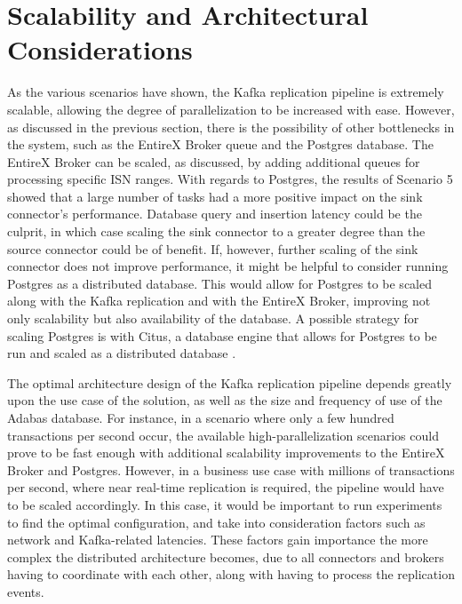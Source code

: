 \section{Scalability and Architectural Considerations}
As the various scenarios have shown, the Kafka replication pipeline is extremely scalable, allowing the degree of parallelization to be increased with ease. However, as discussed in the previous section, there is the possibility of other bottlenecks in the system, such as the EntireX Broker queue and the Postgres database. The EntireX Broker can be scaled, as discussed, by adding additional queues for processing specific \ac{ISN} ranges. With regards to Postgres, the results of Scenario 5 showed that a large number of tasks had a more positive impact on the sink connector's performance. Database query and insertion latency could be the culprit, in which case scaling the sink connector to a greater degree than the source connector could be of benefit. If, however, further scaling of the sink connector does not improve performance, it might be helpful to consider running Postgres as a distributed database. This would allow for Postgres to be scaled along with the Kafka replication and with the EntireX Broker, improving not only scalability but also availability of the database. A possible strategy for scaling Postgres is with Citus, a database engine that allows for Postgres to be run and scaled as a distributed database \cite{cubukcu2021citus}.

The optimal architecture design of the Kafka replication pipeline depends greatly upon the use case of the solution, as well as the size and frequency of use of the Adabas database. For instance, in a scenario where only a few hundred transactions per second occur, the available high-parallelization scenarios could prove to be fast enough with additional scalability improvements to the EntireX Broker and Postgres. However, in a business use case with millions of transactions per second, where near real-time replication is required, the pipeline would have to be scaled accordingly. In this case, it would be important to run experiments to find the optimal configuration, and take into consideration factors such as network and Kafka-related latencies. These factors gain importance the more complex the distributed architecture becomes, due to all connectors and brokers having to coordinate with each other, along with having to process the replication events.

